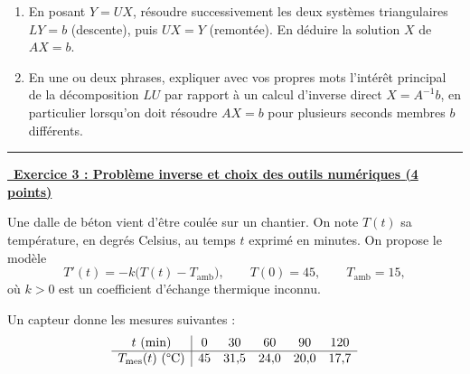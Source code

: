 \begin{enumerate}
    \item En posant $Y=UX$, résoudre successivement les deux systèmes triangulaires $LY=b$ (descente), puis $UX=Y$ (remontée). En déduire la solution $X$ de $AX=b$.

    \item En une ou deux phrases, expliquer avec vos propres mots l'intérêt principal de la décomposition $LU$ par rapport à un calcul d'inverse direct $X=A^{-1}b$, en particulier lorsqu'on doit résoudre $AX=b$ pour plusieurs seconds membres $b$ différents.
\end{enumerate}

\hfill\break
\hrule
\hfill\break

\underline{\, \bf{Exercice 3 : Problème inverse et choix des outils numériques} \bf{(4 points)}}
\medskip

Une dalle de béton vient d'être coulée sur un chantier. On note $T(t)$ sa température, en degrés Celsius, au temps $t$ exprimé en minutes.
On propose le modèle
\[
T'(t)=-k\bigl(T(t)-T_{\mathrm{amb}}\bigr),
\qquad T(0)=45,
\qquad T_{\mathrm{amb}}=15,
\]
où $k>0$ est un coefficient d'échange thermique inconnu.

Un capteur donne les mesures suivantes :
\[
\begin{array}{c|ccccc}
t\text{ (min)} & 0 & 30 & 60 & 90 & 120 \\
\hline
T_{\mathrm{mes}}(t)\text{ }(\text{\textdegree C}) & 45 & 31{,}5 & 24{,}0 & 20{,}0 & 17{,}7
\end{array}
\]

